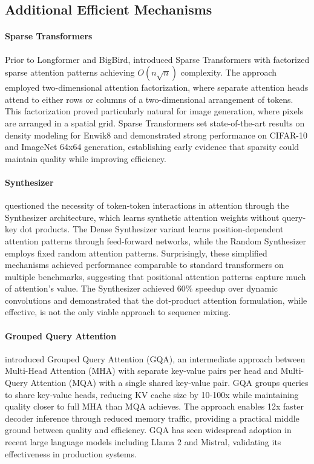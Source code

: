 \subsection{Additional Efficient Mechanisms}

\paragraph{Sparse Transformers}

Prior to Longformer and BigBird, \citet{child2019generating} introduced Sparse Transformers with factorized sparse attention patterns achieving $O(n\sqrt{n})$ complexity. The approach employed two-dimensional attention factorization, where separate attention heads attend to either rows or columns of a two-dimensional arrangement of tokens. This factorization proved particularly natural for image generation, where pixels are arranged in a spatial grid. Sparse Transformers set state-of-the-art results on density modeling for Enwik8 and demonstrated strong performance on CIFAR-10 and ImageNet 64x64 generation, establishing early evidence that sparsity could maintain quality while improving efficiency.

\paragraph{Synthesizer}

\citet{tay2020synthesizer} questioned the necessity of token-token interactions in attention through the Synthesizer architecture, which learns synthetic attention weights without query-key dot products. The Dense Synthesizer variant learns position-dependent attention patterns through feed-forward networks, while the Random Synthesizer employs fixed random attention patterns. Surprisingly, these simplified mechanisms achieved performance comparable to standard transformers on multiple benchmarks, suggesting that positional attention patterns capture much of attention's value. The Synthesizer achieved 60\% speedup over dynamic convolutions and demonstrated that the dot-product attention formulation, while effective, is not the only viable approach to sequence mixing.

\paragraph{Grouped Query Attention}

\citet{ainslie2023gqa} introduced Grouped Query Attention (GQA), an intermediate approach between Multi-Head Attention (MHA) with separate key-value pairs per head and Multi-Query Attention (MQA) with a single shared key-value pair. GQA groups queries to share key-value heads, reducing KV cache size by 10-100x while maintaining quality closer to full MHA than MQA achieves. The approach enables 12x faster decoder inference through reduced memory traffic, providing a practical middle ground between quality and efficiency. GQA has seen widespread adoption in recent large language models including Llama 2 and Mistral, validating its effectiveness in production systems.

